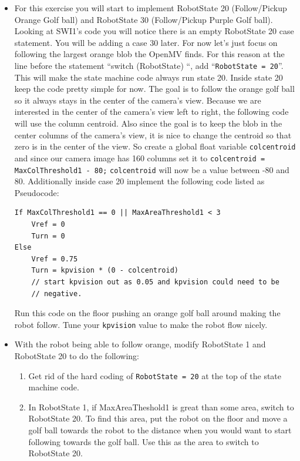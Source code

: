 \documentclass[11pt]{article}
\begin{document}
%
%
\begin{itemize}
        \item For this exercise you will start to implement RobotState 20 (Follow/Pickup Orange Golf ball) and RobotState 30 (Follow/Pickup Purple Golf ball). Looking at SWI1’s code you will notice there is an empty RobotState 20 case statement. You will be adding a case 30 later. For now let’s just focus on following the largest orange blob the OpenMV finds. For this reason at the line before the statement “switch (RobotState) \textbraceleft“, add “\texttt{RobotState = 20}”. This will make the state machine code always run state 20. Inside state 20 keep the code pretty simple for now. The goal is to follow the orange golf ball so it always stays in the center of the camera’s view. Because we are interested in the center of the camera’s view left to right, the following code will use the column centroid. Also since the goal is to keep the blob in the center columns of the camera’s view, it is nice to change the centroid so that zero is in the center of the view. So create a global float variable \texttt{colcentroid} and since our camera image has 160 columns set it to \texttt{colcentroid = MaxColThreshold1 - 80;} \texttt{colcentroid} will now be a value between -80 and 80. Additionally inside case 20 implement the following code listed as Pseudocode:
\begin{verbatim}
If MaxColThreshold1 == 0 || MaxAreaThreshold1 < 3
    Vref = 0
    Turn = 0
Else
    Vref = 0.75
    Turn = kpvision * (0 - colcentroid)
    // start kpvision out as 0.05 and kpvision could need to be
    // negative.
\end{verbatim}
        Run this code on the floor pushing an orange golf ball around making the robot follow. Tune your \texttt{kpvision} value to make the robot flow nicely.
    \item With the robot being able to follow orange, modify RobotState 1 and RobotState 20 to do the following:
        \begin{enumerate}
                \item Get rid of the hard coding of \texttt{RobotState = 20} at the top of the state machine code.
            \item In RobotState 1, if MaxAreaTheshold1 is great than some area, switch to RobotState 20. To find this area, put the robot on the floor and move a golf ball towards the robot to the distance when you would want to start following towards the golf ball. Use this as the area to switch to RobotState 20.

\end{enumerate}
\end{itemize}
\end{document}
